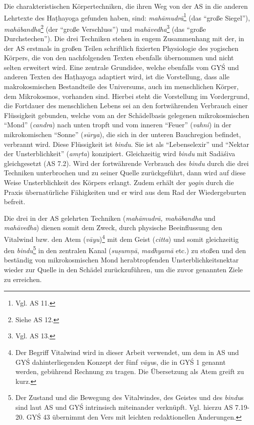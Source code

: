 \documentclass[a4paper,12pt]{article}
\begin{document}
{Die charakteristischen Körpertechniken, die ihren Weg von der AS in die anderen Lehrtexte des Haṭhayoga gefunden haben, sind: \textit{mahāmudrā}\footnote{Vgl. AS 11.} (das ``große Siegel''), \textit{mahābandha}\footnote{Siehe AS 12.} (der ``große Verschluss'') und \textit{mahāvedha}\footnote{Vgl. AS 13.} (das ``große Durchstechen''). Die drei Techniken stehen in engem Zusammenhang mit der, in der AS erstmals in großen Teilen schriftlich fixierten Physiologie des yogischen Körpers, die von den nachfolgenden Texten ebenfalls übernommen und nicht selten erweitert wird. Eine zentrale Grundidee, welche ebenfalls vom GYŚ und anderen Texten des Haṭhayoga adaptiert wird, ist die Vorstellung, dass alle makrokosmischen Bestandteile des Universums, auch im menschlichen Körper, dem Mikrokosmos, vorhanden sind. Hierbei steht die Vorstellung im Vordergrund, die Fortdauer des menschlichen Lebens sei an den fortwährenden Verbrauch einer Flüssigkeit gebunden, welche vom an der Schädelbasis gelegenen mikrokosmischen ``Mond'' (\textit{candra}) nach unten tropft und vom inneren ``Feuer'' (\textit{vahni}) in der mikrokomischen ``Sonne'' (\textit{sūrya}), die sich in der unteren Bauchregion befindet, verbrannt wird. Diese Flüssigkeit ist \textit{bindu}. Sie ist als ``Lebenselexir'' und ``Nektar der Unsterblichkeit'' (\textit{amṛta}) konzipiert. Gleichzeitig wird \textit{bindu} mit Sadāśiva gleichgesetzt (AS 7.2). Wird der fortwährende Verbrauch des \textit{bindu} durch die drei Techniken unterbrochen und zu seiner Quelle zurückgeführt, dann wird auf diese Weise Unsterblichkeit des Körpers erlangt. Zudem erhält der \textit{yogin} durch die Praxis übernatürliche Fähigkeiten und er wird aus dem Rad der Wiedergeburten befreit.

Die drei in der AS gelehrten Techniken (\textit{mahāmudrā, mahābandha} und \textit{mahāvedha}) dienen somit dem Zweck, durch physische Beeinflussung den Vitalwind bzw. den Atem (\textit{vāyu})\footnote{Der Begriff Vitalwind wird in dieser Arbeit verwendet, um dem in AS und GYŚ dahinterliegenden Konzept der fünf \textit{vāyu}s, die in GYŚ 1 genannt werden, gebührend Rechnung zu tragen. Die Übersetzung als Atem greift zu kurz.} mit dem Geist (\textit{citta}) und somit gleichzeitig den \textit{bindu}\footnote{Der Zustand und die Bewegung des Vitalwindes, des Geistes und des \textit{bindu}s sind laut AS und GYŚ intrinsisch miteinander verknüpft. Vgl. hierzu AS 7.19-20. GYŚ 43 übernimmt den Vers mit leichten redaktionellen Änderungen.} in den zentralen Kanal (\textit{suṣumṇā}, \textit{madhyamā} etc.) zu stoßen und den beständig von mikrokosmischen Mond herabtropfenden Unsterblichkeitsnektar wieder zur Quelle in den Schädel zurückzuführen, um die zuvor genannten Ziele zu erreichen. 

}
\end{document}
